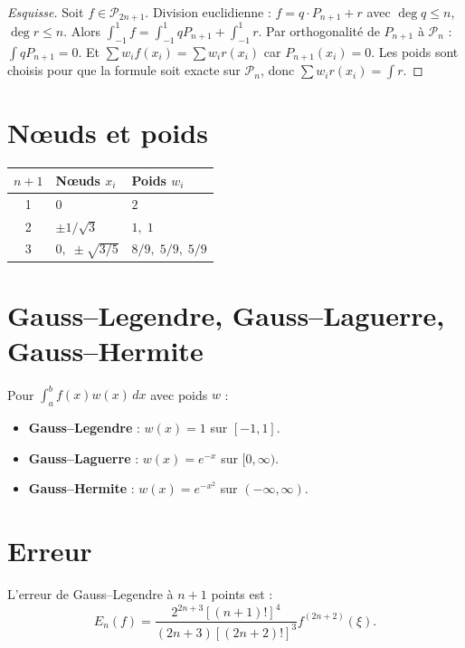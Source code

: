\begin{proof}[Esquisse]
Soit $f\in\mathcal{P}_{2n+1}$. Division euclidienne : $f=q\cdot P_{n+1}+r$ avec $\deg q\leq n$, $\deg r\leq n$. Alors $\int_{-1}^1 f=\int_{-1}^1 qP_{n+1}+\int_{-1}^1 r$. Par orthogonalit\'e de $P_{n+1}$ \`a $\mathcal{P}_n$ : $\int qP_{n+1}=0$. Et $\sum w_i f(x_i)=\sum w_i r(x_i)$ car $P_{n+1}(x_i)=0$. Les poids sont choisis pour que la formule soit exacte sur $\mathcal{P}_n$, donc $\sum w_i r(x_i)=\int r$.
\end{proof}

\section{N\oe uds et poids}

\begin{center}
\begin{tabular}{cll}
\toprule
$n+1$ & N\oe uds $x_i$ & Poids $w_i$ \\
\midrule
1 & $0$ & $2$ \\
2 & $\pm 1/\sqrt{3}$ & $1,\;1$ \\
3 & $0,\;\pm\sqrt{3/5}$ & $8/9,\;5/9,\;5/9$ \\
\bottomrule
\end{tabular}
\end{center}

\section{Gauss--Legendre, Gauss--Laguerre, Gauss--Hermite}

\begin{definition}
Pour $\int_a^b f(x)w(x)\,dx$ avec poids $w$ :
\begin{itemize}
\item \textbf{Gauss--Legendre} : $w(x)=1$ sur $[-1,1]$.
\item \textbf{Gauss--Laguerre} : $w(x)=e^{-x}$ sur $[0,\infty)$.
\item \textbf{Gauss--Hermite} : $w(x)=e^{-x^2}$ sur $(-\infty,\infty)$.
\end{itemize}
\end{definition}

\section{Erreur}

\begin{theoreme}
L'erreur de Gauss--Legendre \`a $n+1$ points est :
\[
E_n(f) = \frac{2^{2n+3}[(n+1)!]^4}{(2n+3)[(2n+2)!]^3}f^{(2n+2)}(\xi).
\]
\end{theoreme}

